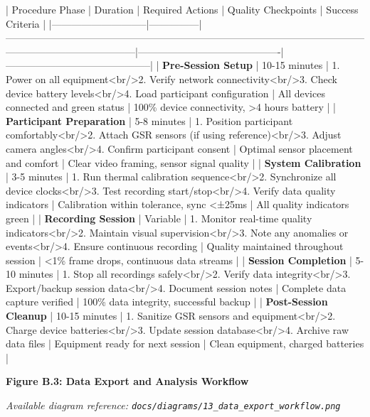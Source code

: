 \documentclass[11pt,a4paper]{article}
\begin{document}
| Procedure Phase             | Duration      | Required Actions                                                                                                                                  | Quality Checkpoints                       | Success Criteria                           |
|-----------------------------|---------------|---------------------------------------------------------------------------------------------------------------------------------------------------|-------------------------------------------|--------------------------------------------|
| \textbf{Pre-Session Setup}       | 10-15 minutes | 1. Power on all equipment<br/>2. Verify network connectivity<br/>3. Check device battery levels<br/>4. Load participant configuration             | All devices connected and green status    | 100\% device connectivity, >4 hours battery |
| \textbf{Participant Preparation} | 5-8 minutes   | 1. Position participant comfortably<br/>2. Attach GSR sensors (if using reference)<br/>3. Adjust camera angles<br/>4. Confirm participant consent | Optimal sensor placement and comfort      | Clear video framing, sensor signal quality |
| \textbf{System Calibration}      | 3-5 minutes   | 1. Run thermal calibration sequence<br/>2. Synchronize all device clocks<br/>3. Test recording start/stop<br/>4. Verify data quality indicators   | Calibration within tolerance, sync <±25ms | All quality indicators green               |
| \textbf{Recording Session}       | Variable      | 1. Monitor real-time quality indicators<br/>2. Maintain visual supervision<br/>3. Note any anomalies or events<br/>4. Ensure continuous recording | Quality maintained throughout session     | <1\% frame drops, continuous data streams   |
| \textbf{Session Completion}      | 5-10 minutes  | 1. Stop all recordings safely<br/>2. Verify data integrity<br/>3. Export/backup session data<br/>4. Document session notes                        | Complete data capture verified            | 100\% data integrity, successful backup     |
| \textbf{Post-Session Cleanup}    | 10-15 minutes | 1. Sanitize GSR sensors and equipment<br/>2. Charge device batteries<br/>3. Update session database<br/>4. Archive raw data files                 | Equipment ready for next session          | Clean equipment, charged batteries         |

\textbf{Figure B.3: Data Export and Analysis Workflow}

\textit{Available diagram reference: \texttt{docs/diagrams/13\_data\_export\_workflow.png}}
\end{document}

